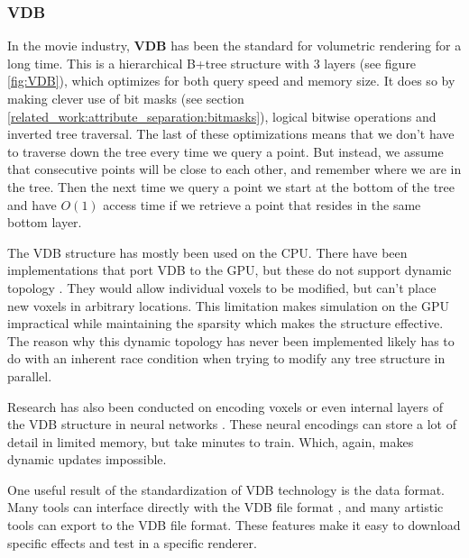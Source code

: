 \subsubsection{VDB} \label{related_work:voxel_data_structures:vdb}
In the movie industry, \textbf{VDB} \cite{museth2013vdb} has been the standard for volumetric rendering for a long time. This is a hierarchical B+tree structure with 3 layers (see figure \ref{fig:VDB}), which optimizes for both query speed and memory size. It does so by making clever use of bit masks (see section \ref{related_work:attribute_separation:bitmasks}), logical bitwise operations and inverted tree traversal. The last of these optimizations means that we don't have to traverse down the tree every time we query a point. But instead, we assume that consecutive points will be close to each other, and remember where we are in the tree. Then the next time we query a point we start at the bottom of the tree and have $O(1)$ access time if we retrieve a point that resides in the same bottom layer.

The VDB structure has mostly been used on the CPU. There have been implementations that port VDB to the GPU, but these do not support dynamic topology \cite{hoetzlein2016gvdb} \cite{museth2021nanovdb}. They would allow individual voxels to be modified, but can't place new voxels in arbitrary locations. This limitation makes simulation on the GPU impractical while maintaining the sparsity which makes the structure effective. The reason why this dynamic topology has never been implemented likely has to do with an inherent race condition when trying to modify any tree structure in parallel.

Research has also been conducted on encoding voxels or even internal layers of the VDB structure in neural networks \cite{kim2022neuralvdb}. These neural encodings can store a lot of detail in limited memory, but take minutes to train. Which, again, makes dynamic updates impossible.

One useful result of the standardization of VDB technology is the data format. Many tools can interface directly with the VDB file format \cite{VDBADeepDive}, and many artistic tools can export to the VDB file format. These features make it easy to download specific effects and test in a specific renderer.

